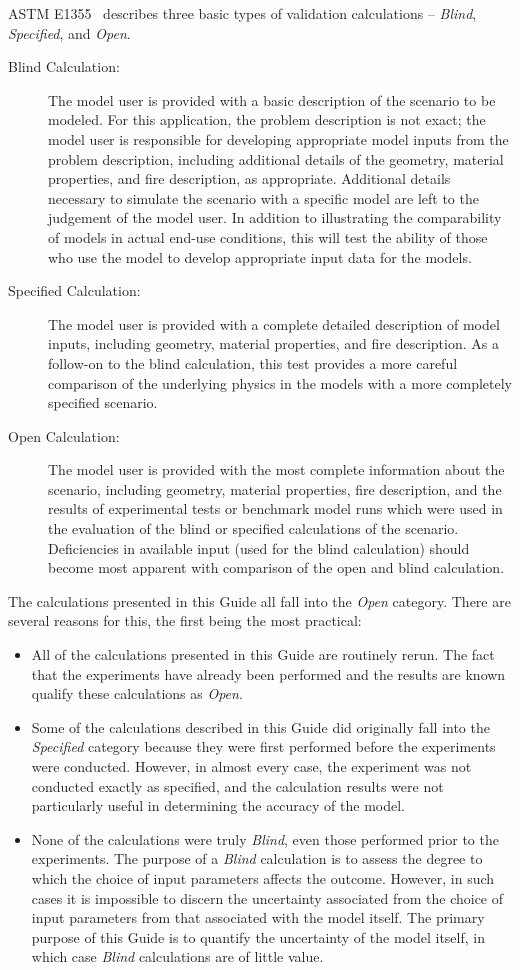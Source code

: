 ASTM E1355~\cite{CFAST:ASTM:E1355} describes three basic types of validation calculations -- {\em Blind}, {\em Specified}, and
{\em Open}.
\begin{description}
\item [Blind Calculation:] The model user is provided with a basic description of the scenario to be modeled. For this application, the problem description is not exact; the model user is responsible for developing appropriate model inputs from the problem description, including additional details of the geometry, material properties, and fire description, as appropriate. Additional details necessary to simulate the scenario with a specific model are left to the judgement of the model user. In addition to illustrating the comparability of models in actual end-use conditions, this will test the ability of those who use the model to develop appropriate input data for the models.
\item [Specified Calculation:] The model user is provided with a complete detailed description of model inputs, including geometry, material properties, and fire description. As a follow-on to the blind calculation, this test provides a more careful comparison of the underlying physics in the models with a more completely specified scenario.
\item [Open Calculation:] The model user is provided with the most complete information about the scenario, including geometry, material properties, fire description, and the results of experimental tests or benchmark model runs which were used in the evaluation of the blind or specified calculations of the scenario. Deficiencies in available input (used for the blind calculation) should become most apparent with comparison of the open and blind calculation.
\end{description}
The calculations presented in this Guide all fall into the {\em Open} category. There are several reasons for this, the first being the most practical:
\begin{itemize}
\item All of the calculations presented in this Guide are routinely rerun. The fact that the experiments have already been performed and the results are known qualify these calculations as {\em Open}.
\item Some of the calculations described in this Guide did originally fall into the {\em Specified} category because they were first performed before the experiments were conducted. However, in almost every case, the experiment was not conducted exactly as specified, and the calculation results were not particularly useful in determining the accuracy of the model. \item None of the calculations were truly {\em Blind}, even those performed prior to the experiments. The purpose of a {\em Blind} calculation is to assess the degree to which the choice of input parameters affects the outcome. However, in such cases it is impossible to discern the uncertainty associated from the choice of input parameters from that associated with the model itself. The primary purpose of this Guide is to quantify the uncertainty of the model itself, in which case {\em Blind} calculations are of little value.
\end{itemize}


